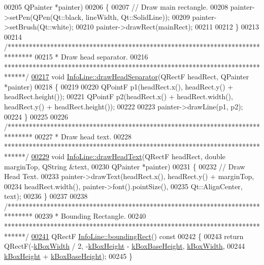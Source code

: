 \begin{DoxyCode}
00205                                  QPainter *painter)
00206 \{
00207   \textcolor{comment}{// Draw main rectangle.}
00208   painter->setPen(QPen(Qt::black, lineWidth, Qt::SolidLine));
00209   painter->setBrush(Qt::white);
00210   painter->drawRect(mainRect);
00211 
00212 \}
00213 
00214 \textcolor{comment}{/*******************************************************************************}
00215 \textcolor{comment}{ * Draw head separator.}
00216 \textcolor{comment}{ ******************************************************************************/}
\hypertarget{infoline_8cpp_source_l00217}{}\hyperlink{class_info_line_a53e9012a9cef4f07f1d4872c6d250c08}{00217} \textcolor{keywordtype}{void} \hyperlink{class_info_line_a53e9012a9cef4f07f1d4872c6d250c08}{InfoLine::drawHeadSeparator}(QRectF headRect, QPainter *painter)
00218 \{
00219 
00220   QPointF p1(headRect.x(), headRect.y() + headRect.height());
00221   QPointF p2(headRect.x() + headRect.width(), headRect.y() + headRect.height());
00222 
00223   painter->drawLine(p1, p2);
00224 \}
00225 
00226 \textcolor{comment}{/*******************************************************************************}
00227 \textcolor{comment}{ * Draw head text.}
00228 \textcolor{comment}{ ******************************************************************************/}
\hypertarget{infoline_8cpp_source_l00229}{}\hyperlink{class_info_line_a043932fa92604badc063e09691195609}{00229} \textcolor{keywordtype}{void} \hyperlink{class_info_line_a043932fa92604badc063e09691195609}{InfoLine::drawHeadText}(QRectF headRect, \textcolor{keywordtype}{double} marginTop, QString &text,
00230                             QPainter *painter)
00231 \{
00232   \textcolor{comment}{// Draw Head Text.}
00233   painter->drawText(headRect.x(), headRect.y() + marginTop,
00234                     headRect.width(), painter->font().pointSize(),
00235                     Qt::AlignCenter, text);
00236 \}
00237 
00238 \textcolor{comment}{/*******************************************************************************}
00239 \textcolor{comment}{ * Bounding Rectangle.}
00240 \textcolor{comment}{ ******************************************************************************/}
\hypertarget{infoline_8cpp_source_l00241}{}\hyperlink{class_info_line_a3103eee5d5a8b4fd53d428f9aea01830}{00241} QRectF \hyperlink{class_info_line_a3103eee5d5a8b4fd53d428f9aea01830}{InfoLine::boundingRect}()\textcolor{keyword}{ const}
00242 \textcolor{keyword}{}\{
00243   \textcolor{keywordflow}{return} QRectF(-\hyperlink{class_info_line_a33821aa140dc03829357d4006e9c153c}{kBoxWidth} / 2, -\hyperlink{class_info_line_a9e459549795bab79ae3b6c184dc78a00}{kBoxHeight} - \hyperlink{class_info_line_ab50f47aa54c45def219859e9da3755e6}{kBoxBaseHeight}, 
      \hyperlink{class_info_line_a33821aa140dc03829357d4006e9c153c}{kBoxWidth},
00244                 \hyperlink{class_info_line_a9e459549795bab79ae3b6c184dc78a00}{kBoxHeight} + \hyperlink{class_info_line_ab50f47aa54c45def219859e9da3755e6}{kBoxBaseHeight});
00245 \}
\end{DoxyCode}
